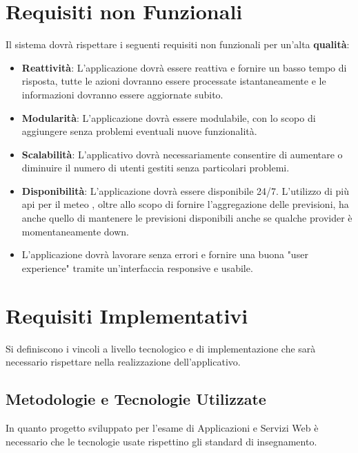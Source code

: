 	\section{Requisiti non Funzionali}	
    Il sistema dovrà rispettare i seguenti requisiti non funzionali per un'alta \textbf{qualità}:
 
            \begin{itemize}
                \item \textbf{Reattività}: L'applicazione dovrà essere reattiva e fornire un basso tempo di risposta, tutte le azioni dovranno essere processate istantaneamente e le informazioni dovranno essere aggiornate subito.
                
                \item \textbf{Modularità}: L'applicazione dovrà essere modulabile, con lo scopo di aggiungere senza problemi eventuali nuove funzionalità.
                
                \item \textbf{Scalabilità}: L'applicativo dovrà necessariamente consentire di aumentare o diminuire il numero di utenti gestiti senza particolari problemi. 
                
                \item \textbf{Disponibilità}: L'applicazione dovrà essere disponibile 24/7. L'utilizzo di più api per il meteo , oltre allo scopo di fornire l'aggregazione delle previsioni, ha anche quello di mantenere le previsioni disponibili anche se qualche provider è momentaneamente down.
                
                \item L'applicazione dovrà lavorare senza errori e fornire una buona "user experience" tramite un'interfaccia responsive e usabile.
            \end{itemize}
        

	\section{Requisiti Implementativi}
	Si definiscono i vincoli a livello tecnologico e di implementazione che sarà necessario rispettare nella realizzazione dell'applicativo.
	
	\subsection{Metodologie e Tecnologie Utilizzate}
	In quanto progetto sviluppato per l'esame di Applicazioni e Servizi Web è necessario che le tecnologie usate rispettino gli standard di insegnamento. 
	